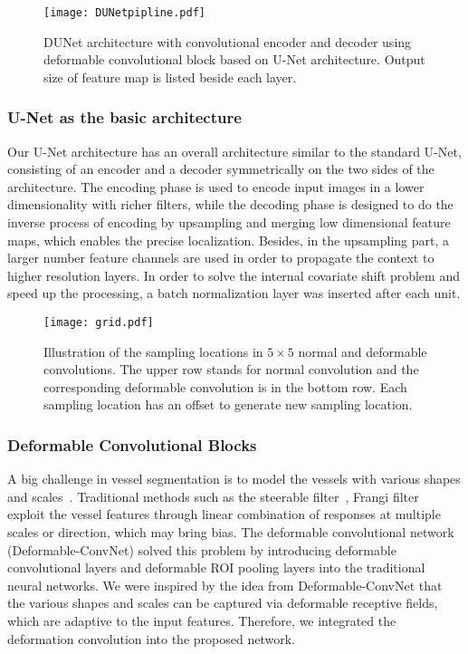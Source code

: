 \documentclass[journal]{IEEEtran}
\begin{document}
\begin{figure*}
\centering
\texttt{[image: DUNetpipline.pdf]}
\caption{DUNet architecture with convolutional encoder and decoder using deformable convolutional block based on U-Net architecture. Output size of feature map is listed beside each layer.}
\label{fig:DUNetpipline}
\end{figure*}

\subsubsection{U-Net as the basic architecture}
Our U-Net architecture has an overall architecture similar to the standard U-Net, consisting of an encoder and a decoder symmetrically on the two sides of the architecture. The encoding phase is used to encode input images in a lower dimensionality with richer filters, while the decoding phase is designed to do the inverse process of encoding by upsampling and merging low dimensional feature maps, which enables the precise localization. Besides, in the upsampling part, a larger number feature channels are used in order to propagate the context to higher resolution layers. In order to solve the internal covariate shift problem and speed up the processing, a batch normalization layer was inserted after each unit.
\begin{figure}
\centering
\texttt{[image: grid.pdf]}
\caption{Illustration of the sampling locations in $5 \times 5$ normal and deformable convolutions. The upper row stands for normal convolution and the corresponding deformable convolution is in the bottom row. Each sampling location has an offset to generate new sampling location.}
\label{fig:grid}
\end{figure}
\subsubsection{Deformable Convolutional Blocks}
A big challenge in vessel segmentation is to model the vessels with various shapes and scales~\cite{dai_deformable_2017}. Traditional methods such as the steerable filter~\cite{freeman_design_1991}, Frangi filter~\cite{frangi_muliscale_1998} exploit the vessel features through linear combination of responses at multiple scales or direction, which may bring bias. The deformable convolutional network (Deformable-ConvNet) solved this problem by introducing deformable convolutional layers and deformable ROI pooling layers into the traditional neural networks. We were inspired by the idea from Deformable-ConvNet that the various shapes and scales can be captured via deformable receptive fields, which are adaptive to the input features. Therefore, we integrated the deformation convolution into the proposed network.
\end{document}
